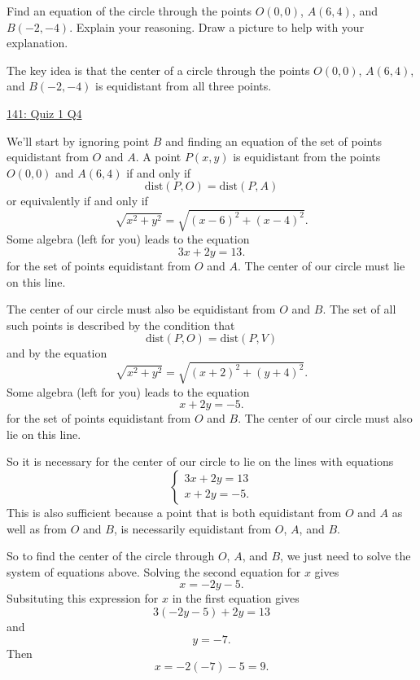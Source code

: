 \documentclass{ximera}
\begin{document}
\begin{question} \label{Qsdfl4345r3}
Find an equation of the circle through the points $O(0,0)$, $A(6,4)$, and $B(-2,-4)$. Explain your reasoning. Draw a picture to help with your explanation.

\begin{explanation}
The key idea is that the center of a circle through the points $O(0,0)$, $A(6,4)$, and $B(-2,-4)$ is equidistant from all three points. 

\begin{onlineOnly}
    \begin{center}
\end{center}
\end{onlineOnly}

\href{https://www.desmos.com/calculator/uqzhkgp2ju}{141: Quiz 1 Q4}

We'll start by ignoring point $B$ and finding an equation of the set of points equidistant from $O$ and $A$. A point $P(x,y)$ is equidistant from the points $O(0,0)$ and $A(6,4)$ if and only if
\[
       \text{dist}(P,O) = \text{dist}(P,A) 
\]
or equivalently if and only if 
\[
   \sqrt{x^2+y^2} = \sqrt{(x-6)^2 + (x-4)^2}  .
\]
Some algebra (left for you) leads to the equation
\[
       3x + 2y = 13 .
\]
for the set of points equidistant from $O$ and $A$. The center of our circle must lie on this line.

The center of our circle must also be equidistant from $O$ and $B$. The set of all such points is described by the condition that
\[
   \text{dist}(P,O) = \text{dist}(P,V) 
\]
and by the equation
\[
   \sqrt{x^2+y^2} = \sqrt{(x+2)^2 + (y+4)^2}  .
\]
Some algebra (left for you) leads to the equation
\[
       x+2y = -5 .
\]
for the set of points equidistant from $O$ and $B$. The center of our circle must also lie on this line.

So it is necessary for the center of our circle to lie on the lines with equations
\[
 \begin{cases}
             3x  + 2y = 13 \\
             x+2y = -5   .
\end{cases}
\]
This is also sufficient because a point that is both equidistant from $O$ and $A$ as well as from $O$ and $B$, is necessarily equidistant from $O$, $A$, and $B$. 

So to find the center of the circle through $O$, $A$, and $B$, we just need to solve the system of equations above. Solving the second equation for $x$ gives
\[
     x = -2y - 5.
\]
Subsituting this expression for $x$ in the first equation gives
\[
   3 (-2y-5) + 2y = 13 
\]
and 
\[
          y= -7 .
\]
Then 
\[
   x = -2(-7) - 5  = 9 .
\]


\end{explanation}
\end{question}
\end{document}
